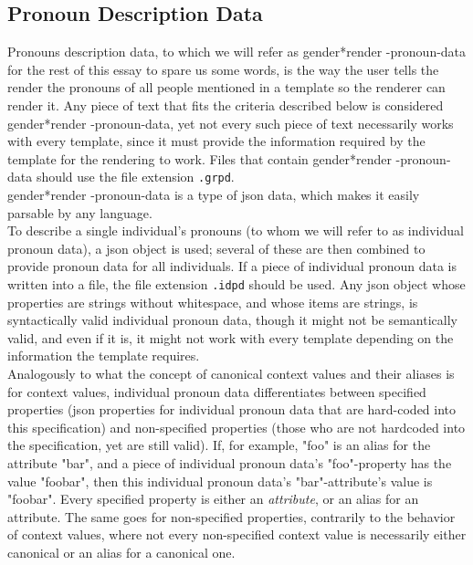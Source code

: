 \documentclass{article}
\newcommand{\GenderRender}{
    gender*render
}
\begin{document}
    \subsection{Pronoun Description Data}

     Pronouns description data, to which we will refer as \GenderRender-pronoun-data for the rest of this essay to spare us some words, is the way the user tells the render the pronouns of all people mentioned in a template so the renderer can render it.
     Any piece of text that fits the criteria described below is considered \GenderRender-pronoun-data, yet not every such piece of text necessarily works with every template, since it must provide the information required by the template for the rendering to work.
    Files that contain \GenderRender-pronoun-data should use the file extension \texttt{.grpd}.\\

    \GenderRender-pronoun-data is a type of json data, which makes it easily parsable by any language.\\

    To describe a single individual's pronouns (to whom we will refer to as individual pronoun data), a json object is used;
    several of these are then combined to provide pronoun data for all individuals.
    If a piece of individual pronoun data is written into a file, the file extension \texttt{.idpd} should be used.
    Any json object whose properties are strings without whitespace, and whose items are strings, is syntactically valid individual pronoun data, though it might not be semantically valid, and even if it is, it might not work with every template depending on the information the template requires.\\

    Analogously to what the concept of canonical context values and their aliases is for context values, individual pronoun data differentiates between specified properties (json properties for individual pronoun data that are hard-coded into this specification) and non-specified properties (those who are not hardcoded into the specification, yet are still valid).
    If, for example, "foo" is an alias for the attribute "bar", and a piece of individual pronoun data's "foo"-property has the value "foobar", then this individual pronoun data's "bar"-attribute's value is "foobar".
    Every specified property is either an \emph{attribute}, or an alias for an attribute.
    The same goes for non-specified properties, contrarily to the behavior of context values, where not every non-specified context value is necessarily either canonical or an alias for a canonical one.\\
\end{document}
